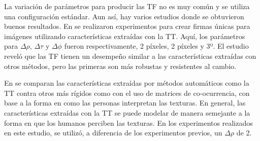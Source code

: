 La variación de parámetros para producir las TF no es muy común y se utiliza una configuración estándar. Aun así, hay varios estudios donde se obtuvieron buenos resultados. En \cite{Kadyrov2003} se realizaron experimentos para crear firmas únicas para imágenes utilizando características extraídas con la TT. Aquí, los parámetros para $\Delta \rho$, $\Delta \tau$ y $\Delta \phi$ fueron respectivamente, 2 píxeles, 2 píxeles  y 3º. El estudio reveló que las TF tienen un desempeño similar a las características extraídas con otros métodos, pero las primeras son más robustas y resistentes al cambio.

En \cite{Petrou2007} se comparan las características extraídas por métodos automáticos como la TT contra otros más rígidos como con el uso de matrices de co-ocurrencia, con base a la forma en como las personas interpretan las texturas. En general, las características extraídas con la TT se puede modelar de manera semejante a la forma en que los humanos perciben las texturas. En los experimentos realizados en este estudio, se utilizó, a diferencia de los experimentos previos, un $\Delta \rho$ de 2.




